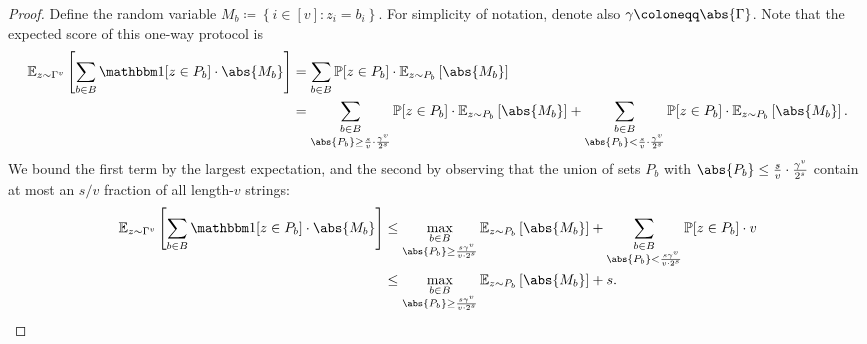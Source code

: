 \documentclass[10pt,a4paper]{article}
\theoremstyle{definition}
\newcommand{\E}{\mathbb E}
\renewcommand{\P}{\mathbb P}
\renewcommand{\set}[1]{\left\{#1\right\}}
\newcommand{\vcommitlength}{v}
\newcommand{\vcommitstring}{z}
\newcommand{\alphabet}{\Gamma}
\newcommand{\alphabetsize}{\gamma}
\newcommand{\chf}{\mathbbm 1}
\begin{document}
\begin{proof}
    Define the random variable $M_b \coloneqq \set{i \in [\vcommitlength] : \vcommitstring_i = b_i}$. For simplicity of notation, denote also $\alphabetsize \coloneqq \abs{\alphabet}$. Note that the expected score of this one-way protocol is
    \begin{align*}
        \E_{\vcommitstring \sim \alphabet^\vcommitlength}\left[\sum_{b \in B} \chf[\vcommitstring \in P_b] \cdot \abs{M_b}\right] &= \sum_{b \in B} \P[\vcommitstring \in P_b] \cdot \E_{\vcommitstring \sim P_b}\left[\abs{M_b}\right]\\
        &= \sum_{\substack{b \in B\\\abs{P_b} \geq \frac{s}{\vcommitlength} \cdot \frac{\alphabetsize^\vcommitlength}{2^s}}} \P[\vcommitstring \in P_b] \cdot \E_{\vcommitstring \sim P_b}\left[\abs{M_b}\right] + \sum_{\substack{b \in B\\\abs{P_b} < \frac{s}{\vcommitlength} \cdot \frac{\alphabetsize^\vcommitlength}{2^s}}} \P[\vcommitstring \in P_b] \cdot \E_{\vcommitstring \sim P_b}\left[\abs{M_b}\right].
    \end{align*}
    We bound the first term by the largest expectation, and the second by observing that the union of sets $P_b$ with $\abs{P_b} \leq \frac{s}{\vcommitlength} \cdot \frac{\alphabetsize^\vcommitlength}{2^s}$ contain at most an $s/\vcommitlength$ fraction of all length-$\vcommitlength$ strings:
    \begin{align*}
        \E_{\vcommitstring \sim \alphabet^\vcommitlength}\left[\sum_{b \in B} \chf[\vcommitstring \in P_b] \cdot \abs{M_b}\right] &\leq \max_{\substack{b \in B\\\abs{P_b} \geq \frac{s \alphabetsize^\vcommitlength}{\vcommitlength \cdot 2^s}}} \E_{\vcommitstring \sim P_b}\left[\abs{M_b}\right] + \sum_{\substack{b \in B\\\abs{P_b} < \frac{s \alphabetsize^\vcommitlength}{\vcommitlength \cdot 2^s}}} \P[\vcommitstring \in P_b] \cdot \vcommitlength\\
        &\leq \max_{\substack{b \in B\\\abs{P_b} \geq \frac{s \alphabetsize^\vcommitlength}{\vcommitlength \cdot 2^s}}} \E_{\vcommitstring \sim P_b}\left[\abs{M_b}\right] + s.
    \end{align*}


\end{proof}
\end{document}
